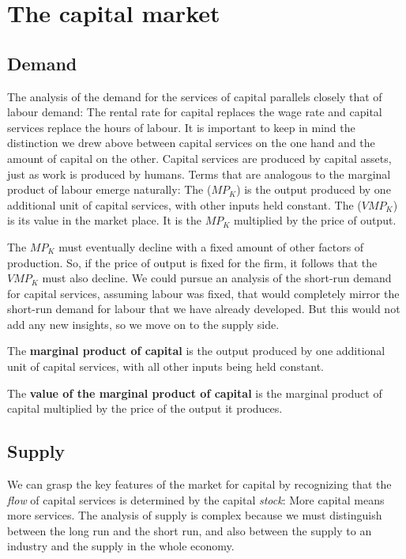 \section{The capital market}\label{sec:ch12sec5}

\subsection*{Demand}

The analysis of the demand for the services of capital parallels closely
that of labour demand: The rental rate for capital replaces the wage rate
and capital services replace the hours of labour. It is important to keep in
mind the distinction we drew above between capital services on the one hand
and the amount of capital on the other. Capital services are produced by
capital assets, just as work is produced by humans. Terms that are analogous
to the marginal product of labour emerge naturally: The %
 ($MP_K$) is the output produced by
one additional unit of capital services, with other inputs held constant.
The  ($VMP_K$) is its value in
the market place. It is the $MP_K$ multiplied by the price of output.

The $MP_K$ must eventually decline with a fixed amount of other factors of
production. So, if the price of output is fixed for the firm, it follows
that the $VMP_K$ must also decline. We could pursue an analysis of the 
short-run demand for capital services, assuming labour was fixed, that would
completely mirror the short-run demand for labour that we have already
developed. But this would not add any new insights, so we move on to the
supply side.

\begin{DefBox}
The \textbf{marginal product of capital} is the output produced by one additional unit of capital services, with all other inputs being held constant.

The \textbf{value of the marginal product of capital} is the marginal product of capital multiplied by the price of the output it produces.
\end{DefBox}

\newhtmlpage

\subsection*{Supply}

We can grasp the key features of the market for capital by recognizing that
the \textit{flow} of capital services is determined by the capital \textit{%
stock}: More capital means more services. The analysis of supply is complex
because we must distinguish between the long run and the short run, and also
between the supply to an industry and the supply in the whole economy.

